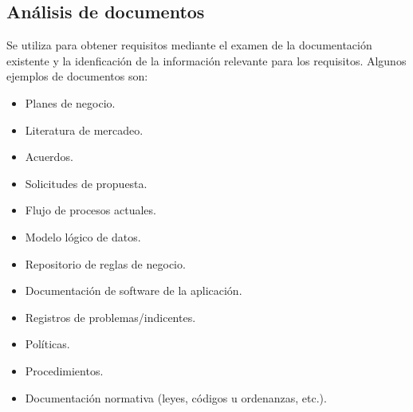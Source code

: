\documentclass{templateApunte}
\begin{document}
\subsection{Análisis de documentos}\hypertarget{analisis_de_documentos}{}
Se utiliza para obtener requisitos mediante el examen de la documentación existente y la idenficación de la información relevante para los requisitos.
Algunos ejemplos de documentos son:
\begin{itemize}
  \item Planes de negocio.
  \item Literatura de mercadeo.
  \item Acuerdos.
  \item Solicitudes de propuesta.
  \item Flujo de procesos actuales.
  \item Modelo lógico de datos.
  \item Repositorio de reglas de negocio.
  \item Documentación de software de la aplicación.
  \item Registros de problemas/indicentes.
  \item Políticas.
  \item Procedimientos.
  \item Documentación normativa (leyes, códigos u ordenanzas, etc.).
\end{itemize}
\end{document}
